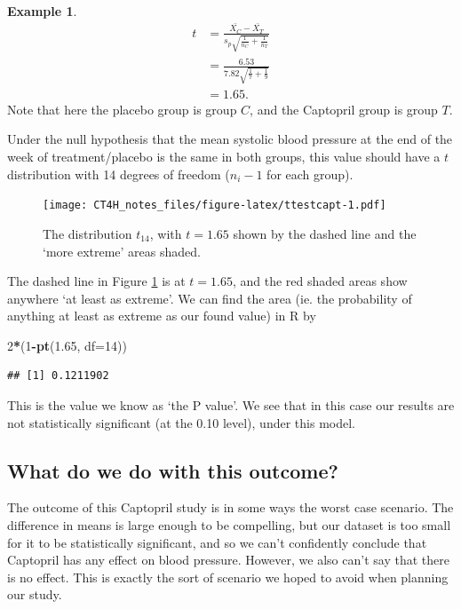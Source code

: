 \documentclass[
  openany]{book}
\newenvironment{Shaded}{\begin{snugshade}}{\end{snugshade}}
\newcommand{\AttributeTok}[1]{\textcolor[rgb]{0.13,0.29,0.53}{#1}}
\newcommand{\DecValTok}[1]{\textcolor[rgb]{0.00,0.00,0.81}{#1}}
\newcommand{\FloatTok}[1]{\textcolor[rgb]{0.00,0.00,0.81}{#1}}
\newcommand{\FunctionTok}[1]{\textcolor[rgb]{0.13,0.29,0.53}{\textbf{#1}}}
\newcommand{\NormalTok}[1]{#1}
\newcommand{\SpecialCharTok}[1]{\textcolor[rgb]{0.81,0.36,0.00}{\textbf{#1}}}
\theoremstyle{definition}
\theoremstyle{definition}
\newtheorem{example}{Example}[chapter]
\theoremstyle{definition}
\theoremstyle{definition}
\theoremstyle{remark}
\begin{document}
\begin{example}
\[
  \begin{aligned}
t & = \frac{\bar{X_C} - \bar{X_T}}{s_p\sqrt{\frac{1}{n_C} + \frac{1}{n_T}}}\\
& = \frac{6.53}{7.82\sqrt{\frac{1}{7} + \frac{1}{9}}} \\
& = 1.65.
\end{aligned}
\]
Note that here the placebo group is group \(C\), and the Captopril group is group \(T\).

Under the null hypothesis that the mean systolic blood pressure at the end of the week of treatment/placebo is the same in both groups, this value should have a \(t\) distribution with 14 degrees of freedom (\(n_i-1\) for each group).

\begin{figure}
\centering
\texttt{[image: CT4H\_notes\_files/figure-latex/ttestcapt-1.pdf]}
\caption{\label{fig:ttestcapt}The distribution \(t_{14}\), with \(t=1.65\) shown by the dashed line and the `more extreme' areas shaded.}
\end{figure}

The dashed line in Figure \ref{fig:ttestcapt} is at \(t=1.65\), and the red shaded areas show anywhere `at least as extreme'. We can find the area (ie. the probability of anything at least as extreme as our found value) in R by

\begin{Shaded}
\begin{Highlighting}[]
\DecValTok{2}\SpecialCharTok{*}\NormalTok{(}\DecValTok{1}\SpecialCharTok{{-}}\FunctionTok{pt}\NormalTok{(}\FloatTok{1.65}\NormalTok{, }\AttributeTok{df=}\DecValTok{14}\NormalTok{))}
\end{Highlighting}
\end{Shaded}

\begin{verbatim}
## [1] 0.1211902
\end{verbatim}

This is the value we know as `the P value'. We see that in this case our results are not statistically significant (at the 0.10 level), under this model.
\end{example}

\hypertarget{what-do-we-do-with-this-outcome}{%
\subsection{What do we do with this outcome?}\label{what-do-we-do-with-this-outcome}}

The outcome of this Captopril study is in some ways the worst case scenario. The difference in means is large enough to be compelling, but our dataset is too small for it to be statistically significant, and so we can't confidently conclude that Captopril has any effect on blood pressure. However, we also can't say that there is no effect. This is exactly the sort of scenario we hoped to avoid when planning our study.
\end{document}
